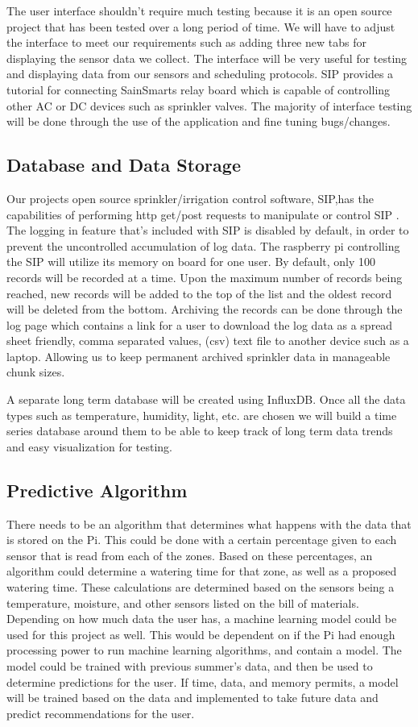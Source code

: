 \documentclass[letterpaper, 10 pt, conference]{ieeeconf}  %
\begin{document}
The user interface shouldn't require much testing because it is an open source project that has been tested over a long period of time. We will have to adjust the interface to meet our requirements such as adding three new tabs for displaying the sensor data we collect. The interface will be very useful for testing and displaying data from our sensors and scheduling protocols. SIP provides a tutorial for connecting SainSmarts relay board which is capable of controlling other AC or DC devices such as sprinkler valves. The majority of interface testing will be done through the use of the application and fine tuning bugs/changes.

\subsection{Database and Data Storage}
Our projects open source sprinkler/irrigation control software, SIP,has the capabilities of performing http get/post requests to manipulate or control SIP \cite{SIP}. The logging in feature that's included with SIP is disabled by default, in order to prevent the uncontrolled accumulation of log data. The raspberry pi controlling the SIP will utilize its memory on board for one user. By default, only 100 records will be recorded at a time. Upon the maximum number of records being reached, new records will be added to the top of the list and the oldest record will be deleted from the bottom. Archiving the records can be done through the log page which contains a link for a user to download the log data as a spread sheet friendly, comma separated values, (csv) text file to another device such as a laptop. Allowing us to keep permanent archived sprinkler data in manageable chunk sizes.

A separate long term database will be created using InfluxDB. Once all the data types such as temperature, humidity, light, etc. are chosen we will build a time series database around them to be able to keep track of long term data trends and easy visualization for testing.

\subsection{Predictive Algorithm}
There needs to be an algorithm that determines what happens with the data that is stored on the Pi. This could be done with a certain percentage given to each sensor that is read from each of the zones. Based on these percentages, an algorithm could determine a watering time for that zone, as well as a proposed watering time. These calculations are determined based on the sensors being a temperature, moisture, and other sensors listed on the bill of materials. Depending on how much data the user has, a machine learning model could be used for this project as well. This would be dependent on if the Pi had enough processing power to run machine learning algorithms, and contain a model. The model could be trained with previous summer's data, and then be used to determine predictions for the user. If time, data, and memory permits, a model will be trained based on the data and implemented to take future data and predict recommendations for the user. 
\end{document}
